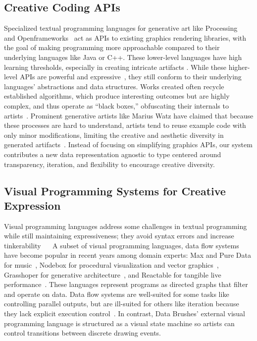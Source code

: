 \documentclass{sigchi}
\newcommand {\jen}[1]{{\color{teal}\bf{JJ: #1}\normalfont}}
\begin{document}
\subsection{Creative Coding APIs}
Specialized textual programming languages for generative art like Processing~\cite{processing} and Openframeworks~\cite{openframeworks} act as APIs %
to existing graphics rendering libraries, with the goal of making programming more approachable compared to their underlying languages like Java or C++. These lower-level languages have high learning thresholds, especially in creating intricate artifacts \cite{Ko:2004:SLB:1032665.1034570}. While these higher-level APIs are powerful and expressive~\cite{processing_handbook,ofbookphil}, they still conform to their underlying languages' abstractions and data structures. Works created often recycle established algorithms, which produce interesting outcomes but are highly complex, and thus operate as ``black boxes,'' obfuscating their internals to artists~\cite{dorin2012framework}. Prominent generative artists like Marius Watz have claimed that because these processes are hard to understand, artists tend to reuse example code with only minor modifications, limiting the creative and aesthetic diversity in generated artifacts~\cite{watz_algorithms,watz-eyeo}. Instead of focusing on simplifying graphics APIs, our system contributes a new data representation agnostic to type centered around transparency, iteration, and flexibility to encourage creative diversity.

\subsection{Visual Programming Systems for Creative Expression}
Visual programming languages address some challenges in textual programming while still maintaining expressiveness; they avoid syntax errors and increase tinkerability ~\cite{myers1990taxonomies,resnick_rosenbaum}~%
A subset of visual programming languages, data flow systems have become popular in recent years among domain experts: Max and Pure Data for music~\cite{max, puredata}, Nodebox for procedural visualization and vector graphics~\cite{nodebox}, Grasshoper for generative architecture~\cite{grasshopper}, and Reactable for tangible live performance~\cite{reactable}. These languages represent programs as directed graphs that filter and operate on data. Data flow systems are well-suited for some tasks like controlling parallel outputs, but are ill-suited for others like iteration because they lack explicit execution control~\cite{Johnston:2004:ADP:1013208.1013209}. In contrast, Data Brushes' external visual programming language is structured as a visual state machine so artists can control transitions between discrete drawing events. %
\end{document}
